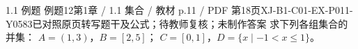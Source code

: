 \par\noindent\begin{minipage}{\linewidth}
\begin{bankitem}{1.1 例题 例题12}{第1章 / 1.1 集合 / 教材 p.11 / PDF 第18页}{XJ-B1-C01-EX-P011-Y0583}{已对照原页转写题干及公式；待教师复核；未制作答案}
求下列各组集合的并集：
$A=(1,3)$，$B=[2,5]$；
$C=[0,1]$，$D=\{x\mid-1<x\le1\}$。
\end{bankitem}
\end{minipage}\par\medskip
